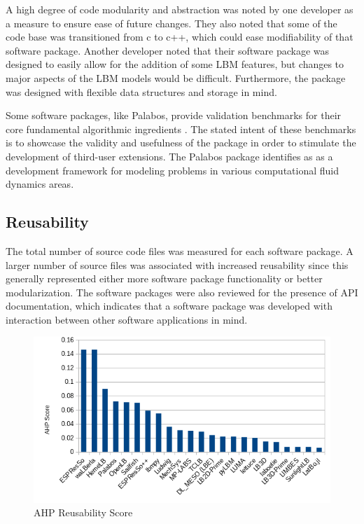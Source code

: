 \documentclass[12pt, notitlepage]{article}
\begin{document}
A high degree of code modularity and abstraction was noted by one developer as a measure to ensure ease of future changes. They also noted that some of the code base was transitioned from c to c++, which could ease modifiability of that software package. Another developer noted that their software package was designed to easily allow for the addition of some LBM features, but changes to major aspects of the LBM models would be difficult. Furthermore, the package was designed with flexible data structures and storage in mind. 

Some software packages, like Palabos, provide validation benchmarks for their core fundamental algorithmic ingredients \citep{latt2021palabos}. The stated intent of these benchmarks is to showcase the validity and usefulness of the package in order to stimulate the development of third-user extensions. The Palabos package identifies as as a development framework for modeling problems in various computational fluid dynamics areas. 

\subsection{Reusability}

The total number of source code files was measured for each software package. A larger number of source files was associated with increased reusability since this generally represented either more software package functionality or better modularization. The software packages were also reviewed for the presence of API documentation, which indicates that a software package was developed with interaction between other software applications in mind. 

\begin{figure}[h!]
	\begin{center}
		\includegraphics[width=1.0\textwidth]{reusability_chart}
		\caption{AHP Reusability Score}
		\label{Fig_Reusabilty}
	\end{center}
\end{figure}
\end{document}
